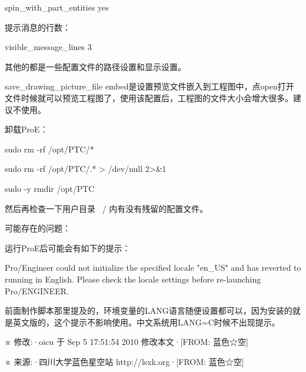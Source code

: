spin\_with\_part\_entities yes

提示消息的行数：

visible\_message\_lines 3

其他的都是一些配置文件的路径设置和显示设置。

save\_drawing\_picture\_file embed是设置预览文件嵌入到工程图中，点open打开文件时候就可以预览工程图了，使用该配置后，工程图的文件大小会增大很多。建议不使用。

卸载ProE：

sudo rm -rf /opt/PTC/*

sudo rm -rf /opt/PTC/.* > /dev/null 2>\&1

sudo -y rmdir /opt/PTC

然后再检查一下用户目录 ~{}/ 内有没有残留的配置文件。

可能存在的问题：

运行ProE后可能会有如下的提示：

Pro/Engineer could not initialize the specified locale "en\_US" and has reverted to running in English. Please check the locale settings before re-launching Pro/ENGINEER. 

前面制作脚本那里提及的，环境变量的LANG语言随便设置都可以，因为安装的就是英文版的，这个提示不影响使用。中文系统用LANG=C时候不出现提示。


※ 修改:·oicu 于 Sep  5 17:51:54 2010 修改本文·[FROM: 蓝色☆空]

※ 来源:·四川大学蓝色星空站 http://lsxk.org·[FROM: 蓝色☆空]



\clearpage



